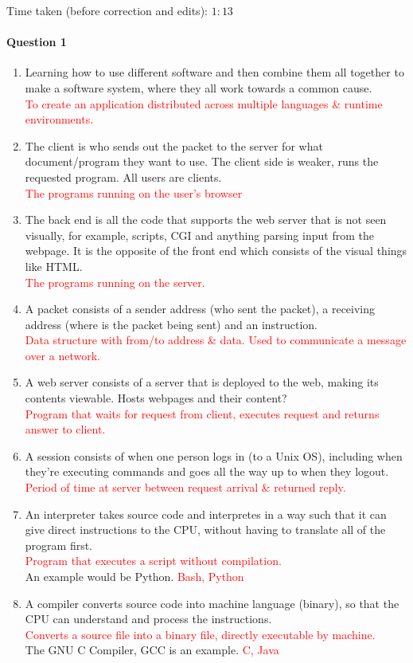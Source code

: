 \documentclass[12 pt]{article}
\begin{document}
\onehalfspacing
Time taken (before correction and edits): $1:13$
\paragraph{Question 1}	
\begin{enumerate}
\item Learning how to use different software and then combine them all together to make a software system, where they all work towards a common cause.
  \\ \textcolor{Red}{To create an application distributed across multiple languages \& runtime environments.}
\item The client is who sends out the packet to the server for what document/program they want to use. The client side is weaker, runs the requested program. All users are clients.
  \\ \textcolor{Red}{The programs running on the user's browser}
\item The back end is all the code that supports the web server that is not seen visually, for example, scripts, CGI and anything parsing input from the webpage. It is the opposite of the front end which consists of the visual things like HTML.
  \\ \textcolor{Red}{The programs running on the server.}
\item A packet consists of a sender address (who sent the packet), a receiving address (where is the packet being sent) and an instruction.
  \\ \textcolor{Red}{Data structure with from/to address \& data. Used to communicate a message over a network.}
\item A web server consists of a server that is deployed to the web, making its contents viewable. Hosts webpages and their content?
  \\ \textcolor{Red}{Program that waits for request from client, executes request and returns answer to client.}
\item A session consists of when one person logs in (to a Unix OS), including when they're executing commands and goes all the way up to when they logout.
  \\ \textcolor{Red}{Period of time at server between request arrival \& returned reply.}
\item An interpreter takes source code and interpretes in a way such that it can give direct instructions to the CPU, without having to translate all of the program first.
  \\ \textcolor{Red}{Program that executes a script without compilation.}
  \\ An example would be Python. \textcolor{Red}{Bash, Python}
\item A compiler converts source code into machine language (binary), so that the CPU can understand and process the instructions.
  \\ \textcolor{Red}{Converts a source file into a binary file, directly executable by machine.}
  \\ The GNU C Compiler, GCC is an example. \textcolor{Red}{C, Java}
\end{enumerate}
\end{document}
